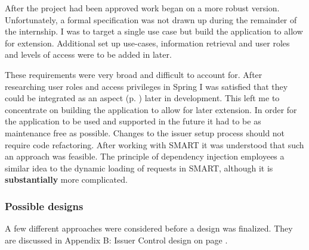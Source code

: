 \documentclass[a4paper, 11pt, titlepage]{article}
\begin{document}
After the project had been approved work began on a more robust version. Unfortunately, a formal specification was not drawn up during the remainder of the internship. I was to target a single use case but build the application to allow for extension. Additional set up use-cases, information retrieval and user roles and levels of access were to be added in later. 
 
These requirements were very broad and difficult to account for. After researching user roles and access privileges in Spring I was satisfied that they could be integrated as an aspect (p. \pageref{aspects}) later in development. This left me to concentrate on building the application to allow for later extension. In order for the application to be used and supported in the future it had to be as maintenance free as possible. Changes to the issuer setup process should not require code refactoring. After working with SMART it was understood that such an approach was feasible. The principle of dependency injection employees a similar idea to the dynamic loading of requests in SMART, although it is \textbf{substantially} more complicated. 


\subsubsection{Possible designs}
A few different approaches were considered before a design was finalized. They are discussed in Appendix B: Issuer Control design on page \pageref{issuer_control}.
 
\end{document}
